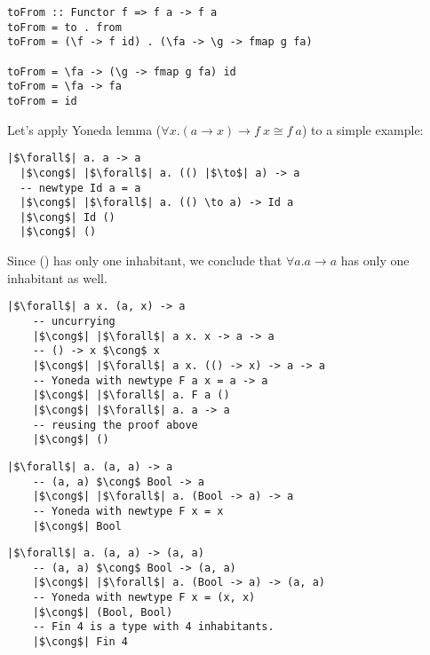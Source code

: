 \documentclass[tikz]{beamer}
\theoremstyle{definition}
\begin{document}
\begin{frame}[fragile]
\begin{verbatim}
toFrom :: Functor f => f a -> f a
toFrom = to . from
toFrom = (\f -> f id) . (\fa -> \g -> fmap g fa)
         
toFrom = \fa -> (\g -> fmap g fa) id
toFrom = \fa -> fa
toFrom = id
\end{verbatim}
\end{frame}

\begin{frame}[fragile]
Let's apply Yoneda lemma ($\forall x. (a \to x) \to f~x \cong f~a$) to a simple example:

\begin{verbatim}
|$\forall$| a. a -> a
  |$\cong$| |$\forall$| a. (() |$\to$| a) -> a
  -- newtype Id a = a
  |$\cong$| |$\forall$| a. (() \to a) -> Id a
  |$\cong$| Id ()
  |$\cong$| ()
\end{verbatim}

Since () has only one inhabitant, we conclude that $\forall a. a \to a$ has only one inhabitant as well.
\end{frame}

\begin{frame}[fragile]
\begin{verbatim}
|$\forall$| a x. (a, x) -> a
    -- uncurrying
    |$\cong$| |$\forall$| a x. x -> a -> a
    -- () -> x $\cong$ x
    |$\cong$| |$\forall$| a x. (() -> x) -> a -> a
    -- Yoneda with newtype F a x = a -> a
    |$\cong$| |$\forall$| a. F a ()
    |$\cong$| |$\forall$| a. a -> a
    -- reusing the proof above
    |$\cong$| ()
\end{verbatim}
\end{frame}

\begin{frame}[fragile]
\begin{verbatim}
|$\forall$| a. (a, a) -> a
    -- (a, a) $\cong$ Bool -> a
    |$\cong$| |$\forall$| a. (Bool -> a) -> a
    -- Yoneda with newtype F x = x
    |$\cong$| Bool
\end{verbatim}
\end{frame}

\begin{frame}[fragile]
\begin{verbatim}
|$\forall$| a. (a, a) -> (a, a)
    -- (a, a) $\cong$ Bool -> (a, a)
    |$\cong$| |$\forall$| a. (Bool -> a) -> (a, a)
    -- Yoneda with newtype F x = (x, x)
    |$\cong$| (Bool, Bool)
    -- Fin 4 is a type with 4 inhabitants.
    |$\cong$| Fin 4
\end{verbatim}
\end{frame}
\end{document}
